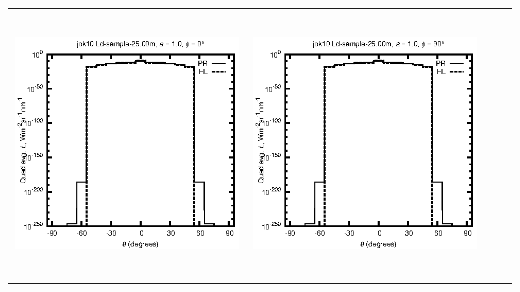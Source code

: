 \documentclass[10pt,a4paper]{article}
\begin{document}
\begin{adjustwidth}{-1.2in}{-1.2in}
\begin{tabular}{c c c c}
\includegraphics[height=7cm]{../eps/jok10_Ld_sample_25.00m_fwd.eps} &
\includegraphics[height=7cm]{../eps/jok10_Ld_sample_25.00m_cross.eps} \\
\end{tabular}

\pagebreak


\end{adjustwidth}
\end{document}
